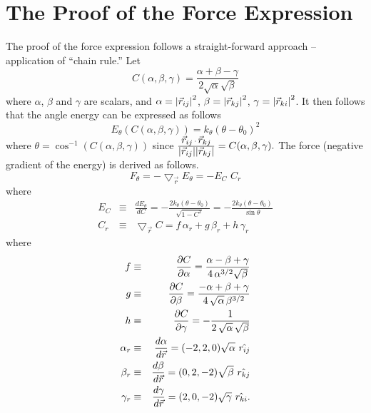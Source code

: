 \section{The Proof of the Force Expression}
The proof of the force expression follows a straight-forward approach
-- application of ``chain rule.'' Let 
\begin{equation}
C(\alpha, \beta, \gamma)=\frac{\alpha + \beta - \gamma}{2
\sqrt{\alpha}\sqrt{\beta}} 
\end{equation}
where $\alpha$, $\beta$ and $\gamma$ are scalars, and $\alpha =
\mbox{$\left| \vec{r}_{ij} \right| $}^2$, $\beta = \mbox{$\left| \vec{r}_{kj} \right| $}^2$, $\gamma = \mbox{$\left| \vec{r}_{ki} \right| $}^2$. It 
then follows that the angle energy can be expressed as follows
\begin{equation}
E_{\theta}(C(\alpha, \beta, \gamma)) = k_{\theta} (\theta - \theta_{0})^2
\end{equation}
where
$\theta = \cos^{-1}(C(\alpha, \beta, \gamma))$ since $\frac{ \mbox{$\vec{r}_{ij}$}\,
\cdot \,\mbox{$\vec{r}_{kj}$}}{ \mbox{$\left| \vec{r}_{ij} \right| $} \mbox{$\left| \vec{r}_{kj} \right| $}} = C(\alpha, \beta, \gamma). $
The force (negative gradient of the energy) is derived as follows.
\begin{equation}
F_{\theta} = - 
\bigtriangledown_{\vec{r}}E_{\theta} = - E_{C} \,\,C_r
\end{equation}
where 
\begin{eqnarray}
E_{C}&\equiv& \frac{dE_{\theta}}{dC} 
= - \frac{2 k_{\theta} (\theta - \theta_0)}{\sqrt{1-C^2}} 
= - \frac{2 k_{\theta} (\theta - \theta_0)}{\sin\theta} \\
C_r  &\equiv& 
\bigtriangledown_{\vec{r}} C = f \, \alpha_r + 
g \, \beta_r + 
h \, \gamma_r
\end{eqnarray}
where
\begin{eqnarray}
f &\equiv& \frac{\partial C}{\partial \alpha} =
\frac{\alpha - \beta + \gamma} 
{4\,\alpha^{3/2}\sqrt{\beta}} \\
g &\equiv& \frac{\partial C}{\partial \beta} = 
\frac{-\alpha + \beta + \gamma}
{4\,\sqrt{\alpha}\, \beta^{3/2}} \\
h &\equiv& \frac{\partial C}{\partial \gamma} 
= -\frac{1}{2\, \sqrt{\alpha}\, \sqrt{\beta}} \\
\alpha_{r} &\equiv&  \frac{d\alpha}{d\vec{r}} = (-2, 2, 0)
\sqrt{\alpha} \,\,\mbox{$\hat{{r}_{ij}}$} \\
 \beta_{r} &\equiv& \frac{d\beta}{d\vec{r}} = (0, 2, -2) 
\sqrt{\beta} \,\,\mbox{$\hat{{r}_{kj}}$}\\
\gamma_{r} &\equiv& \frac{d\gamma}{d\vec{r}} = (2, 0, -2) 
\sqrt{\gamma} \,\,\mbox{$\hat{{r}_{ki}}$}.
\end{eqnarray}


